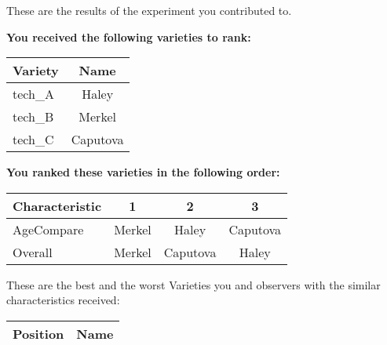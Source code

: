 \documentclass[10pt]{article}
\begin{document}
\begin{titlepage}
	These are the results of the experiment you contributed to.

	\begin{flushleft}
		\textbf{You received the following varieties to rank: }\hfill \break
		\begin{tabularx}{\textwidth}{ X | c  }
			\hline
			\textbf{Variety} & \textbf{Name} \\ \hline

			
				tech\_A & Haley \\ \hline
			
				tech\_B & Merkel \\ \hline
			
				tech\_C & Caputova \\ \hline
			


		\end{tabularx}\newline \newline

		\textbf{You ranked these varieties in the following order: }\hfill \break
		\begin{tabularx}{\textwidth}{ X | c | c | c  }
			\hline
			\textbf{Characteristic}
			
				& \textbf{ 1 }
			
				& \textbf{ 2 }
			
				& \textbf{ 3 }
			
			\\ \hline


			
				AgeCompare & Merkel  & Haley  & Caputova  \\ \hline


			
				Overall & Merkel  & Caputova  & Haley  \\ \hline


			

		\end{tabularx}

	\end{flushleft}

	\pagebreak

	\begin{flushleft}
		These are the best and the worst Varieties you and observers with the similar characteristics received:\hfill \break \newline
		\begin{tabularx}{\textwidth}{ X | X  }
			\hline
			\textbf{Position} & \textbf{Name} \\ \hline


\end{tabularx}
\end{flushleft}
\end{titlepage}
\end{document}

